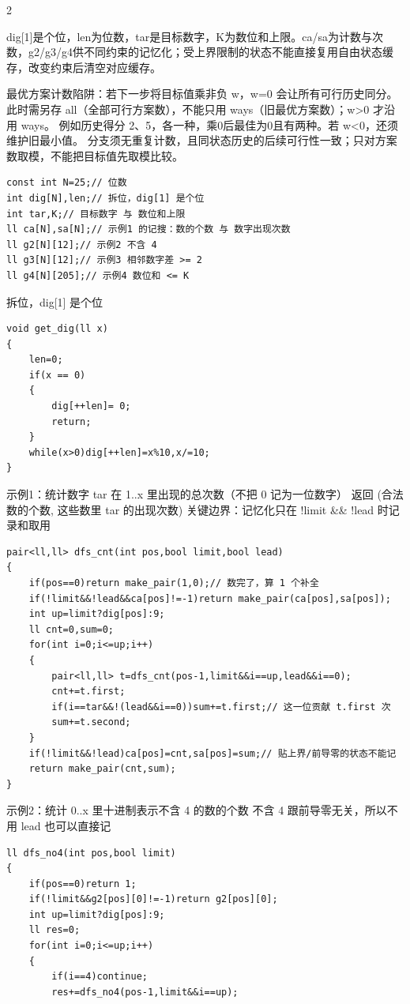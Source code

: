 \documentclass[UTF8,fontset=fandol,a4paper,twoside]{ctexart}
\newcommand{\note}[1]{{\fontsize{10}{12}\selectfont #1\par}}
\begin{document}
\begin{multicols}{2}
\note{dig[\allowbreak{}1]\allowbreak{}是个位，len为位数，tar是目标数字，K为数位和上限。ca/\allowbreak{}sa为计数与次数，g2/\allowbreak{}g3/\allowbreak{}g4供不同约束的记忆化；受上界限制的状态不能直接复用自由状态缓存，改变约束后清空对应缓存。}
\note{最优方案计数陷阱：若下一步将目标值乘非负 w，w=\allowbreak{}0 会让所有可行历史同分。 此时需另存 all（全部可行方案数），不能只用 ways（旧最优方案数）；w>\allowbreak{}0 才沿用 ways。 例如历史得分 2、5，各一种，乘0后最佳为0且有两种。若 w<\allowbreak{}0，还须维护旧最小值。 分支须无重复计数，且同状态历史的后续可行性一致；只对方案数取模，不能把目标值先取模比较。}
\begin{lstlisting}
const int N=25;// 位数
int dig[N],len;// 拆位，dig[1] 是个位
int tar,K;// 目标数字 与 数位和上限
ll ca[N],sa[N];// 示例1 的记搜：数的个数 与 数字出现次数
ll g2[N][12];// 示例2 不含 4
ll g3[N][12];// 示例3 相邻数字差 >= 2
ll g4[N][205];// 示例4 数位和 <= K
\end{lstlisting}
\note{拆位，dig[\allowbreak{}1]\allowbreak{} 是个位}
\begin{lstlisting}
void get_dig(ll x)
{
    len=0;
    if(x == 0)
    {
        dig[++len]= 0;
        return;
    }
    while(x>0)dig[++len]=x%10,x/=10;
}
\end{lstlisting}
\note{示例1：统计数字 tar 在 1.\allowbreak{}.\allowbreak{}x 里出现的总次数（不把 0 记为一位数字） 返回 (\allowbreak{}合法数的个数,\allowbreak{} 这些数里 tar 的出现次数)\allowbreak{} 关键边界：记忆化只在 !limit \&\& !lead 时记录和取用}
\begin{lstlisting}
pair<ll,ll> dfs_cnt(int pos,bool limit,bool lead)
{
    if(pos==0)return make_pair(1,0);// 数完了，算 1 个补全
    if(!limit&&!lead&&ca[pos]!=-1)return make_pair(ca[pos],sa[pos]);
    int up=limit?dig[pos]:9;
    ll cnt=0,sum=0;
    for(int i=0;i<=up;i++)
    {
        pair<ll,ll> t=dfs_cnt(pos-1,limit&&i==up,lead&&i==0);
        cnt+=t.first;
        if(i==tar&&!(lead&&i==0))sum+=t.first;// 这一位贡献 t.first 次
        sum+=t.second;
    }
    if(!limit&&!lead)ca[pos]=cnt,sa[pos]=sum;// 贴上界/前导零的状态不能记
    return make_pair(cnt,sum);
}
\end{lstlisting}
\note{示例2：统计 0.\allowbreak{}.\allowbreak{}x 里十进制表示不含 4 的数的个数 不含 4 跟前导零无关，所以不用 lead 也可以直接记}
\begin{lstlisting}
ll dfs_no4(int pos,bool limit)
{
    if(pos==0)return 1;
    if(!limit&&g2[pos][0]!=-1)return g2[pos][0];
    int up=limit?dig[pos]:9;
    ll res=0;
    for(int i=0;i<=up;i++)
    {
        if(i==4)continue;
        res+=dfs_no4(pos-1,limit&&i==up);

\end{lstlisting}
\end{multicols}
\end{document}
